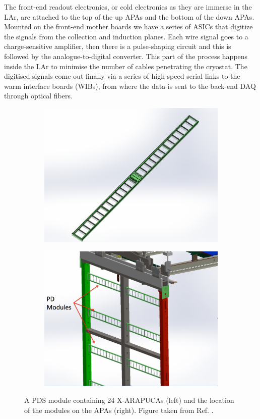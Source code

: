 The front-end readout electronics, or cold electronics as they are immerse in the LAr, are attached to the top of the up APAs and the bottom of the down APAs. Mounted on the front-end mother boards we have a series of ASICs that digitize the signals from the collection and induction planes. Each wire signal goes to a charge-sensitive amplifier, then there is a pulse-shaping circuit and this is followed by the analogue-to-digital converter. This part of the process happens inside the LAr to minimise the number of cables penetrating the cryostat. The digitised signals come out finally via a series of high-speed serial links to the warm interface boards (WIBs), from where the data is sent to the back-end DAQ through optical fibers.

\begin{figure}[h!]
	\begin{subfigure}{0.49\textwidth}
		\centering
		\includegraphics[width=.90\linewidth]{Images/DUNE/FD/pds-module}
	\end{subfigure}
	\begin{subfigure}{0.49\textwidth}
		\centering
		\includegraphics[width=.90\linewidth]{Images/DUNE/FD/pds-in-apa-assembly}
	\end{subfigure}
	\caption[A PDS module containing 24 X-ARAPUCAs and the location of the modules on the APAs.]{A PDS module containing 24 X-ARAPUCAs (left) and the location of the modules on the APAs (right). Figure taken from Ref. \cite{DUNE2020TDR1}.}
	\label{fig:dune_pds}
\end{figure}

